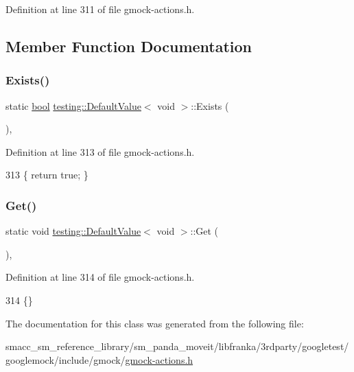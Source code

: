 Definition at line 311 of file gmock-\/actions.\+h.



\subsection{Member Function Documentation}
\mbox{\label{classtesting_1_1DefaultValue_3_01void_01_4_ae18ea46cbf928b820c91f15fa7aa317b}} 
\subsubsection{\texorpdfstring{Exists()}{Exists()}}
{\footnotesize\ttfamily static \hyperlink{classbool}{bool} \hyperlink{classtesting_1_1DefaultValue}{testing\+::\+Default\+Value}$<$ void $>$\+::Exists (\begin{DoxyParamCaption}{ }\end{DoxyParamCaption})\hspace{0.3cm}{\ttfamily [inline]}, {\ttfamily [static]}}



Definition at line 313 of file gmock-\/actions.\+h.


\begin{DoxyCode}
313 \{ \textcolor{keywordflow}{return} \textcolor{keyword}{true}; \}
\end{DoxyCode}
\mbox{\label{classtesting_1_1DefaultValue_3_01void_01_4_acda4c367a5b0c0cfb28bc2289f385eed}} 
\subsubsection{\texorpdfstring{Get()}{Get()}}
{\footnotesize\ttfamily static void \hyperlink{classtesting_1_1DefaultValue}{testing\+::\+Default\+Value}$<$ void $>$\+::Get (\begin{DoxyParamCaption}{ }\end{DoxyParamCaption})\hspace{0.3cm}{\ttfamily [inline]}, {\ttfamily [static]}}



Definition at line 314 of file gmock-\/actions.\+h.


\begin{DoxyCode}
314 \{\}
\end{DoxyCode}


The documentation for this class was generated from the following file\+:\begin{DoxyCompactItemize}
\item 
smacc\+\_\+sm\+\_\+reference\+\_\+library/sm\+\_\+panda\+\_\+moveit/libfranka/3rdparty/googletest/googlemock/include/gmock/\hyperlink{gmock-actions_8h}{gmock-\/actions.\+h}\end{DoxyCompactItemize}
